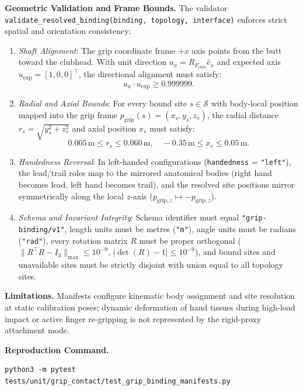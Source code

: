 \documentclass[11pt,a4paper]{article}
\begin{document}
\textbf{Geometric Validation and Frame Bounds.}
The validator \texttt{validate\_resolved\_binding(binding, topology, interface)} enforces strict spatial and orientation consistency:
\begin{enumerate}[leftmargin=*,noitemsep]
\item \textit{Shaft Alignment}: The grip coordinate frame $+x$ axis points from the butt toward the clubhead. With unit direction $u_x = R_{F_{\mathrm{club}}} \hat{e}_x$ and expected axis $u_{\mathrm{exp}} = [1, 0, 0]^{\top}$, the directional alignment must satisfy:
\begin{equation}
u_x \cdot u_{\mathrm{exp}} \ge 0.999999.
\end{equation}
\item \textit{Radial and Axial Bounds}: For every bound site $s \in \mathcal{S}$ with body-local position mapped into the grip frame $p_{\mathrm{grip}}(s) = (x_s, y_s, z_s)$, the radial distance $r_s = \sqrt{y_s^2 + z_s^2}$ and axial position $x_s$ must satisfy:
\begin{equation}
0.005\,\mathrm{m} \le r_s \le 0.060\,\mathrm{m}, \quad -0.35\,\mathrm{m} \le x_s \le 0.05\,\mathrm{m}.
\end{equation}
\item \textit{Handedness Reversal}: In left-handed configurations (\texttt{handedness} = \texttt{"left"}), the lead/trail roles map to the mirrored anatomical bodies (right hand becomes lead, left hand becomes trail), and the resolved site positions mirror symmetrically along the local $z$-axis ($p_{\mathrm{grip},z} \mapsto -p_{\mathrm{grip},z}$).
\item \textit{Schema and Invariant Integrity}: Schema identifier must equal \texttt{"grip-binding/v1"}, length units must be metres (\texttt{"m"}), angle units must be radians (\texttt{"rad"}), every rotation matrix $R$ must be proper orthogonal ($\|R^{\top}R - I_3\|_{\max} \le 10^{-9}$, $|\det(R) - 1| \le 10^{-9}$), and bound sites and unavailable sites must be strictly disjoint with union equal to all topology sites.
\end{enumerate}

\textbf{Limitations.} Manifests configure kinematic body assignment and site resolution at static calibration poses; dynamic deformation of hand tissues during high-load impact or active finger re-gripping is not represented by the rigid-proxy attachment mode.

\textbf{Reproduction Command.}
\begin{verbatim}
python3 -m pytest tests/unit/grip_contact/test_grip_binding_manifests.py
\end{verbatim}
\end{document}
